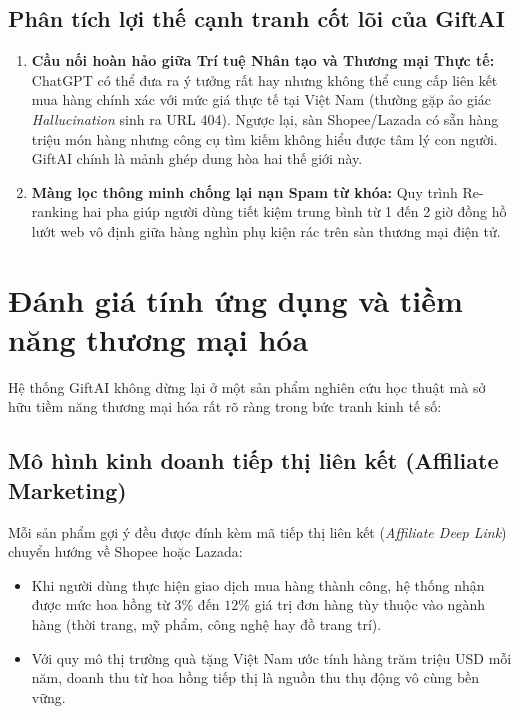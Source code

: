 \subsection{Phân tích lợi thế cạnh tranh cốt lõi của GiftAI}
\begin{enumerate}
    \item \textbf{Cầu nối hoàn hảo giữa Trí tuệ Nhân tạo và Thương mại Thực tế:} ChatGPT có thể đưa ra ý tưởng rất hay nhưng không thể cung cấp liên kết mua hàng chính xác với mức giá thực tế tại Việt Nam (thường gặp ảo giác \textit{Hallucination} sinh ra URL 404). Ngược lại, sàn Shopee/Lazada có sẵn hàng triệu món hàng nhưng công cụ tìm kiếm không hiểu được tâm lý con người. GiftAI chính là mảnh ghép dung hòa hai thế giới này.
    \item \textbf{Màng lọc thông minh chống lại nạn Spam từ khóa:} Quy trình Re-ranking hai pha giúp người dùng tiết kiệm trung bình từ 1 đến 2 giờ đồng hồ lướt web vô định giữa hàng nghìn phụ kiện rác trên sàn thương mại điện tử.
\end{enumerate}

\section{Đánh giá tính ứng dụng và tiềm năng thương mại hóa}

Hệ thống GiftAI không dừng lại ở một sản phẩm nghiên cứu học thuật mà sở hữu tiềm năng thương mại hóa rất rõ ràng trong bức tranh kinh tế số:

\subsection{Mô hình kinh doanh tiếp thị liên kết (Affiliate Marketing)}
Mỗi sản phẩm gợi ý đều được đính kèm mã tiếp thị liên kết (\textit{Affiliate Deep Link}) chuyển hướng về Shopee hoặc Lazada:
\begin{itemize}
    \item Khi người dùng thực hiện giao dịch mua hàng thành công, hệ thống nhận được mức hoa hồng từ $3\%$ đến $12\%$ giá trị đơn hàng tùy thuộc vào ngành hàng (thời trang, mỹ phẩm, công nghệ hay đồ trang trí).
    \item Với quy mô thị trường quà tặng Việt Nam ước tính hàng trăm triệu USD mỗi năm, doanh thu từ hoa hồng tiếp thị là nguồn thu thụ động vô cùng bền vững.
\end{itemize}

